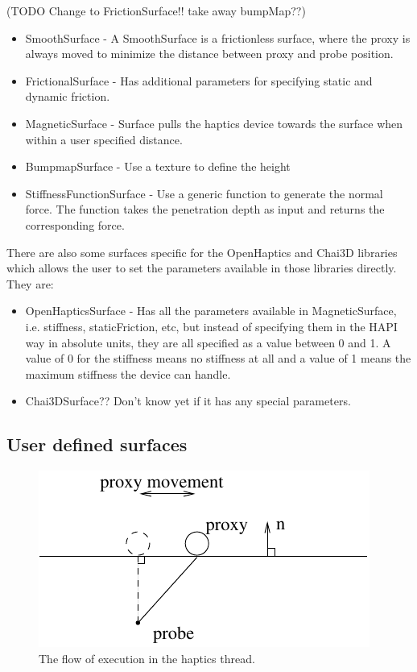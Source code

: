 (TODO Change to FrictionSurface!! take away bumpMap??)
\begin{itemize}
\item SmoothSurface - A SmoothSurface is a frictionless surface, where
  the proxy is always moved to minimize the distance between proxy and
  probe position. 
\item FrictionalSurface - Has additional parameters for specifying
  static and dynamic friction.
\item MagneticSurface - Surface pulls the haptics device towards the
  surface when within a user specified distance.
\item BumpmapSurface - Use a texture to define the height 
\item StiffnessFunctionSurface - Use a generic function to generate
  the normal force. The function takes the penetration depth as input
  and returns the corresponding force. 
\end{itemize}

There are also some surfaces specific for the OpenHaptics and Chai3D
libraries which allows the user to set the parameters available in
those libraries directly. They are:
\begin{itemize}
\item OpenHapticsSurface - Has all the parameters available in
  MagneticSurface, i.e. stiffness, staticFriction, etc, but instead of
  specifying them in the HAPI way in absolute units, they are all
  specified as a value between 0 and 1. A value of 0 for the stiffness
  means no stiffness at all and a value of 1 means the maximum
  stiffness the device can handle.
\item Chai3DSurface?? Don't know yet if it has any special parameters.
\end{itemize}

\subsection{User defined surfaces}

\begin{figure} 
  \centering 
  \includegraphics{images/surface.pdf}
  \caption{The flow of execution in the haptics thread.}
  \label{haptics thread} 
\end{figure}


